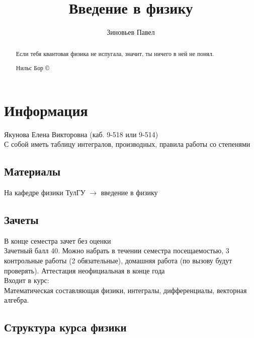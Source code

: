 \documentclass[a4paper, 12pt, oneside]{article}
\title{Введение в физику}
\author{Зиновьев Павел}
\begin{document}
\maketitle
\begin{abstract}
	Если тебя квантовая физика не испугала, значит, ты ничего в ней не понял. 
	\begin{flushright}
		Нильс Бор \copyright 
	\end{flushright}
\end{abstract}
\newpage
\tableofcontents
\contentsname
\newpage

\section{Информация}
Якунова Елена Викторовна (каб. 9-518 или 9-514)\\
С собой иметь таблицу интегралов, производных, правила работы со степенями

\subsection{Материалы}
На кафедре физики ТулГУ $\rightarrow$ введение в физику
\subsection{Зачеты}
В конце семестра зачет без оценки\\
Зачетный балл 40. Можно набрать в течении семестра посещаемостью, 3 контрольные работы (2 обязательные), домашняя работа (по вызову будут проверять). Аттестация неофициальная в конце года\\
Входит в курс:\\
Математическая составляющая физики, интегралы, дифференциалы, векторная алгебра. 

\subsection{Структура курса физики}
\end{document}
